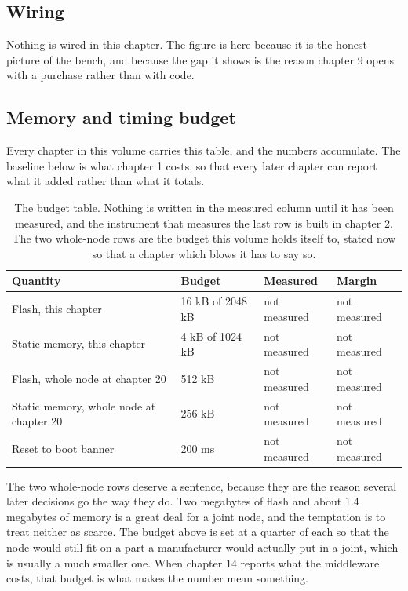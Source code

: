 \subsection*{Wiring}


Nothing is wired in this chapter. The figure is here because it is the honest
picture of the bench, and because the gap it shows is the reason chapter 9 opens
with a purchase rather than with code.

\subsection*{Memory and timing budget}

Every chapter in this volume carries this table, and the numbers accumulate. The
baseline below is what chapter 1 costs, so that every later chapter can report
what it added rather than what it totals.

\begin{table}[H]\centering\small
\begin{tabular}{p{44mm}p{28mm}p{28mm}p{30mm}}
\toprule
Quantity & Budget & Measured & Margin \\
\midrule
Flash, this chapter & 16 kB of 2048 kB & not measured & not measured \\
Static memory, this chapter & 4 kB of 1024 kB & not measured & not measured \\
Flash, whole node at chapter 20 & 512 kB & not measured & not measured \\
Static memory, whole node at chapter 20 & 256 kB & not measured & not measured \\
Reset to boot banner & 200 ms & not measured & not measured \\
\bottomrule
\end{tabular}
\caption{The budget table. Nothing is written in the measured column until it has been measured, and the instrument that measures the last row is built in chapter 2. The two whole-node rows are the budget this volume holds itself to, stated now so that a chapter which blows it has to say so.}
\end{table}

The two whole-node rows deserve a sentence, because they are the reason several
later decisions go the way they do. Two megabytes of flash and about 1.4
megabytes of memory is a great deal for a joint node, and the temptation is to
treat neither as scarce. The budget above is set at a quarter of each so that
the node would still fit on a part a manufacturer would actually put in a joint,
which is usually a much smaller one. When chapter 14 reports what the middleware
costs, that budget is what makes the number mean something.

